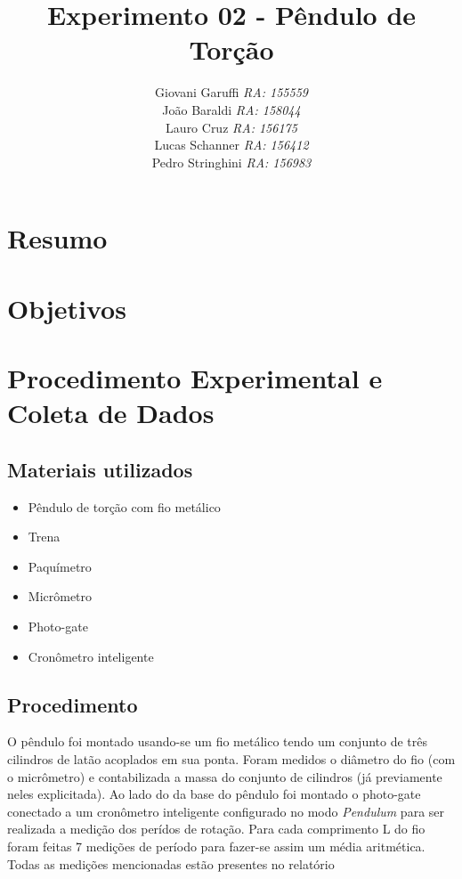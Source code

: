 \documentclass[12pt,a4paper]{article}
\begin{document}
\title{\vspace{70mm}\Huge Experimento 02 - Pêndulo de Torção}
\author{ Giovani Garuffi\qquad\hfill
		\textit {RA: 155559}\protect\\
		João Baraldi\hfill
		\textit{RA: 158044}\protect\\
		Lauro Cruz\hfill
		\textit{RA: 156175}\protect\\
		Lucas Schanner\hfill
		\textit{RA: 156412}\protect\\
		Pedro Stringhini\hfill
		\textit {RA: 156983}								
		}
\maketitle
\newpage
\section{Resumo}


\section{Objetivos}


\section{Procedimento Experimental e Coleta de Dados}

\subsection{Materiais utilizados}
\begin{itemize}
	\item Pêndulo de torção com fio metálico
	\item Trena
	\item Paquímetro
	\item Micrômetro
	\item Photo-gate
	\item Cronômetro inteligente
\end{itemize}

\subsection{Procedimento}
O pêndulo foi montado usando-se um fio metálico tendo um conjunto de três cilindros de latão acoplados em sua ponta. Foram medidos o diâmetro do fio (com o micrômetro) e contabilizada a massa do conjunto de cilindros (já previamente neles explicitada). Ao lado do da base do pêndulo foi montado o photo-gate conectado a um cronômetro inteligente configurado no modo \emph{Pendulum} para ser realizada a medição dos perídos de rotação. Para cada comprimento L do fio foram feitas 7 medições de período para fazer-se assim um média aritmética. Todas as medições mencionadas estão presentes no relatório
\end{document}
